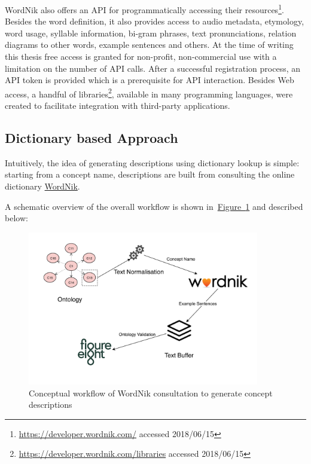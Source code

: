 WordNik also offers an API for programmatically accessing their resources\footnote{\url{https://developer.wordnik.com/} accessed 2018/06/15}. Besides the word definition, it also provides access to audio metadata, etymology, word usage, syllable information, bi-gram phrases, text pronunciations, relation diagrams to other words, example sentences and others. At the time of writing this thesis free access is granted for non-profit, non-commercial use with a limitation on the number of API calls. 
After a successful registration process, an API token is provided which is a prerequisite for API interaction. Besides Web access, a handful of libraries\footnote{\url{https://developer.wordnik.com/libraries} accessed 2018/06/15}, available in many programming languages, were created to facilitate integration with third-party applications. 

\subsection{Dictionary based Approach}\label{sec:enrichment_dictionary_approach}
Intuitively, the idea of generating descriptions using dictionary lookup is simple: starting from a concept name, descriptions are built from consulting the online dictionary \hyperref[sec:wordnik]{WordNik}. 

A schematic overview of the overall workflow is shown in~\hyperref[fig:external_source_workflow]{Figure~\ref*{fig:external_source_workflow}} and described below:
\begin{figure}
	 \centering
	 \includegraphics[width=0.9\textwidth]{drawio/External_Source_Workflow}
	 \caption{Conceptual workflow of WordNik consultation to generate concept descriptions}\label{fig:external_source_workflow}
\end{figure}

